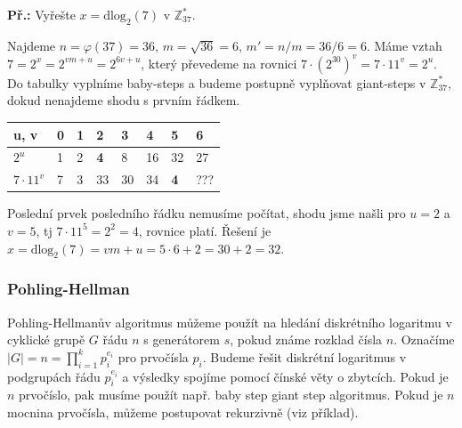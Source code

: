 \begin{exercise}
\textbf{Př.:} Vyřešte $x = \text{dlog}_2 (7)$ v $\mathbb{Z}_{37}^*$.

Najdeme $n = \varphi(37) = 36$, $m = \sqrt{36} = 6$, $m' = n/m = 36/6 = 6$. Máme
vztah $7 = 2^x = 2^{vm + u} = 2^{6v + u}$, který převedeme na rovnici $7\cdot
(2^{30})^v =7\cdot 11^v = 2^u$. Do tabulky vyplníme baby-steps a budeme postupně
vyplňovat giant-steps v $\mathbb{Z}_{37}^*$, dokud nenajdeme shodu s prvním
řádkem.

\begin{center}
\centering
\begin{tabular}{|p{1cm}|p{1cm}|p{1cm}|p{1cm}|p{1cm}|p{1cm}|p{1cm}|p{1cm}|}
\hline
u, v & 0 & 1 & 2 &3 & 4 & 5 & 6\\
\hline
\hline
$2^u$ & 1 & 2 & \textbf{4} & 8 & 16 & 32 & 27\\
\hline
$7\cdot 11^v$ & 7 & 3 & 33 & 30 & 34 & \textbf{4} & ??? \\
\hline
\end{tabular}
\end{center}

Poslední prvek posledního řádku nemusíme počítat, shodu jsme našli pro $u=2$ a
$v=5$, tj $7\cdot 11^5 = 2^2 = 4$, rovnice platí. Řešení je $x = \text{dlog}_2
(7) = vm + u = 5\cdot6 + 2 = 30 + 2 = 32$.
\end{exercise}

\subsubsection{Pohling-Hellman}
Pohling-Hellmanův algoritmus můžeme použít na hledání diskrétního logaritmu v
cyklické grupě $G$ řádu $n$ s generátorem $s$, pokud známe rozklad čísla $n$.
Označíme $|G| = n = \prod_{i=1}^k p_i^{e_i}$ pro prvočísla $p_i$.  Budeme řešit
diskrétní logaritmus v podgrupách řádu $p_i^{e_i}$ a výsledky spojíme pomocí
čínské věty o zbytcích. Pokud je $n$ prvočíslo, pak musíme použít např. baby
step giant step algoritmus. Pokud je $n$ mocnina prvočísla, můžeme postupovat
rekurzivně (viz příklad).


